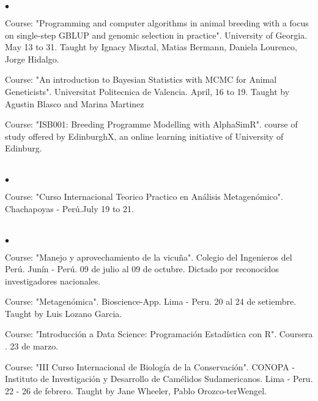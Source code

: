 \documentclass[margin,line,10pt]{res}
\newenvironment{list2}{
  \begin{list}{$\bullet$}{%
      \setlength{\itemsep}{0in}
      \setlength{\parsep}{0in} \setlength{\parskip}{0in}
      \setlength{\topsep}{0in} \setlength{\partopsep}{0in} 
      \setlength{\leftmargin}{0.2in}}}{\end{list}}
\begin{document}
\begin{resume}
\begin{list2}
\item Course: "Programming and computer algorithms in animal breeding with a focus on single-step GBLUP and genomic selection in practice". University of Georgia. May 13 to 31. Taught by Ignacy Misztal, Matias Bermann, Daniela Lourenco, Jorge Hidalgo.
\vspace{0.5cm}
\item Course: "An introduction to Bayesian Statistics with MCMC for Animal Geneticists". Universitat Politecnica de Valencia. April, 16 to 19. Taught by Agustin Blasco and Marina Martinez
\vspace{0.5cm}
\item Course: "ISB001: Breeding Programme Modelling with AlphaSimR". course of study offered by EdinburghX, an online learning initiative of University of Edinburg.
\end{list2}

\section{}

\begin{list2}
\item Course: "Curso Internacional Teorico Practico en Análisis Metagenómico". Chachapoyas - Perú.July 19 to 21.  
\end{list2}

\vspace{0.5cm}

\section{}

\begin{list2}
\item Course: "Manejo y aprovechamiento de la vicuña". Colegio del Ingenieros del Perú. Junín - Perú. 09 de julio al 09 de octubre. Dictado por reconocidos investigadores nacionales.
\vspace{0.5cm}
\item Course: "Metagenómica". Bioscience-App. Lima - Peru. 20 al 24 de setiembre. Taught by Luis Lozano Garcia.
\vspace{0.5cm}
\item Course: "Introducción a Data Science: Programación Estadística con R". Coursera . 23 de marzo. 
\vspace{0.5cm}
\item Course: "III Curso Internacional de Biología de la Conservación". CONOPA - Instituto de Investigación y Desarrollo de Camélidos Sudamericanos. Lima - Peru. 22 - 26 de febrero. Taught by Jane Wheeler, Pablo Orozco-terWengel.
\end{list2}


\end{resume}
\end{document}
